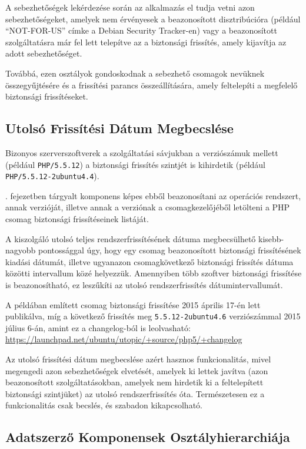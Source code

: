 	A sebezhetőségek lekérdezése során az alkalmazás el tudja vetni azon sebezhetőségeket, amelyek nem érvényesek a beazonosított disztribúcióra (például ``NOT-FOR-US'' címke a Debian Security Tracker-en) vagy a beazonosított szolgáltatásra már fel lett telepítve az a biztonsági frissítés, amely kijavítja az adott sebezhetőséget.
	
	Továbbá, ezen osztályok gondoskodnak a sebezhető csomagok nevüknek összegyűjtésére és a frissítési parancs összeállítására, amely feltelepíti a megfelelő biztonsági frissítéseket.

\subsection*{Utolsó Frissítési Dátum Megbecslése}

	Bizonyos szerverszoftverek a szolgáltatási sávjukban a verziószámuk mellett (például \texttt{PHP/5.5.12}) a biztonsági frissítés szintjét is kihirdetik (például \texttt{PHP/5.5.12-2ubuntu4.4}).
	
	\Az{\ref{ssec:opsysmatcher}}. fejezetben tárgyalt komponens képes ebből beazonosítani az operációs rendszert, annak verzióját, illetve annak a verziónak a csomagkezelőjéből letölteni a PHP csomag biztonsági frissítéseinek listáját.
	
	A kiszolgáló utolsó teljes rendszerfrissítésének dátuma megbecsülhető kisebb-nagyobb pontossággal úgy, hogy egy csomag beazonosított biztonsági frissítésének kiadási dátumát, illetve ugyanazon csomagkövetkező biztonsági frissítés dátuma közötti intervallum közé helyezzük. Amennyiben több szoftver biztonsági frissítése is beazonosítható, ez leszűkíti az utolsó rendszerfrissítés dátumintervallumát.
	
	A példában említett csomag biztonsági frissítése 2015 április 17-én lett publikálva, míg a következő frissítés meg \texttt{5.5.12-2ubuntu4.6} verziószámmal 2015 július 6-án, amint ez a changelog-ból is leolvasható: \url{https://launchpad.net/ubuntu/utopic/+source/php5/+changelog}
	
	Az utolsó frissítési dátum megbecslése azért hasznos funkcionalitás, mivel megengedi azon sebezhetőségek elvetését, amelyek ki lettek javítva (azon beazonosított szolgáltatásokban, amelyek nem hirdetik ki a feltelepített biztonsági szintjüket) az utolsó rendszerfrissítés óta. Természetesen ez a funkcionalitás csak becslés, és szabadon kikapcsolható.

\subsection*{Adatszerző Komponensek Osztályhierarchiája}


